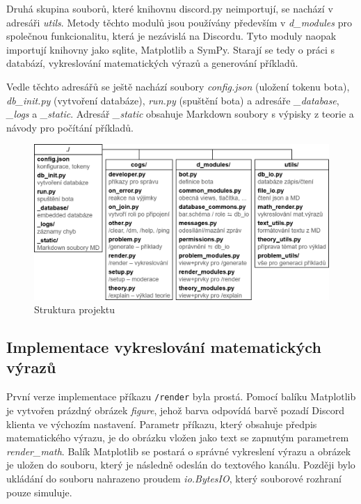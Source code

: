 \documentclass[FM]{tulthesis}
\begin{document}
	Druhá skupina souborů, které knihovnu discord.py neimportují, se nachází v adresáři \textit{utils}. Metody těchto modulů jsou používány především v \textit{d\_modules} pro společnou funkcionalitu, která je nezávislá na Discordu. Tyto moduly naopak importují knihovny jako sqlite, Matplotlib a SymPy. Starají se tedy o práci s databází, vykreslování matematických výrazů a generování příkladů. %
	
	Vedle těchto adresářů se ještě nachází soubory \textit{config.json} (uložení tokenu bota), \textit{db\_init.py} (vytvoření databáze), \textit{run.py} (spuštění bota) a adresáře \textit{\_database}, \textit{\_logs} a \textit{\_static}. Adresář \textit{\_static} obsahuje Markdown soubory s výpisky z teorie a návody pro počítání příkladů. %
	
	\begin{figure}[ht]
		\centering
		\includegraphics[width=\textwidth]{img/ProjectStructure}
		\caption{Struktura projektu}
	\end{figure}

	\subsection{Implementace vykreslování matematických výrazů}

	První verze implementace příkazu \verb|/render| byla prostá. Pomocí balíku Matplotlib je vytvořen prázdný obrázek \textit{figure}, jehož barva odpovídá barvě pozadí Discord klienta ve výchozím nastavení. Parametr příkazu, který obsahuje předpis matematického výrazu, je do obrázku vložen jako text se zapnutým parametrem \textit{render\_math}. Balík Matplotlib se postará o správné vykreslení výrazu a obrázek je uložen do souboru, který je následně odeslán do textového kanálu. Později bylo ukládání do souboru nahrazeno proudem \textit{io.BytesIO}, který souborové rozhraní pouze simuluje.
\end{document}

